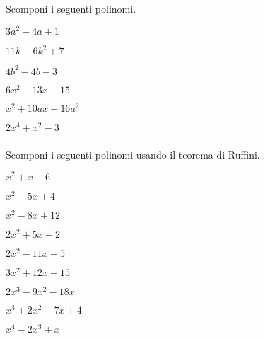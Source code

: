 \begin{esercizio}
\label{ese:17.10}
Scomponi i seguenti polinomi.
\begin{htmulticols}{3}
\begin{enumeratea}
\item \(3a^{{2}}-4a+1\)
\item \(11k-6k^{2}+7\)
\item \(4b^{{2}}-4b-3\)
\item \(6x^{2}-13x-15\)
\item \(x^{2}+10ax+16a^{2}\)
\item \(2x^{{4}}+x^{{2}}-3\)
\end{enumeratea}
\end{htmulticols}
\end{esercizio}

\subsubsection*{}

\begin{esercizio}\label{ese:}
Scomponi i seguenti polinomi usando il teorema di Ruffini.
\begin{htmulticols}{2}
\begin{enumeratea}
\item \(x^{2} + x - 6\)
\item \(x^{2} - 5 x + 4\)
\item \(x^{2} - 8 x + 12\)
\item \(2 x^{2} + 5 x + 2\)
\item \(2 x^{2} - 11 x + 5\)
\item \(3 x^{2} + 12 x - 15\)
\item \(2 x^{3} - 9 x^{2} - 18 x\)
\item \(x^{3} + 2 x^{2} - 7 x + 4\)
\item \(x^{4} - 2 x^{3} + x\)
\end{enumeratea}
\end{htmulticols}
\end{esercizio}


